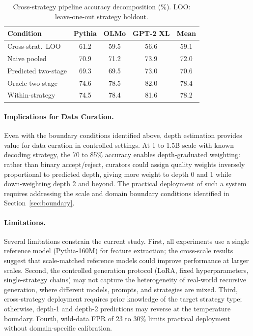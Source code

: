 \documentclass[11pt,a4paper]{article}
\begin{document}
\begin{table}[t]
\centering
\caption{Cross-strategy pipeline accuracy decomposition (\%). LOO: leave-one-out strategy holdout.}
\label{tab:pipeline}
\small
\begin{tabular}{lcccc}
\toprule
Condition & Pythia & OLMo & GPT-2 XL & Mean \\
\midrule
Cross-strat.\ LOO & 61.2 & 59.5 & 56.6 & 59.1 \\
Naive pooled & 70.9 & 71.2 & 73.9 & 72.0 \\
Predicted two-stage & 69.3 & 69.5 & 73.0 & 70.6 \\
Oracle two-stage & 74.6 & 78.5 & 82.0 & 78.4 \\
Within-strategy & 74.5 & 78.4 & 81.6 & 78.2 \\
\bottomrule
\end{tabular}
\end{table}

\paragraph{Implications for Data Curation.}
Even with the boundary conditions identified above, depth estimation provides value for data curation in controlled settings.
At 1 to 1.5B scale with known decoding strategy, the 70 to 85\% accuracy enables depth-graduated weighting: rather than binary accept/reject, curators could assign quality weights inversely proportional to predicted depth, giving more weight to depth 0 and 1 while down-weighting depth 2 and beyond.
The practical deployment of such a system requires addressing the scale and domain boundary conditions identified in Section~\ref{sec:boundary}.

\paragraph{Limitations.}
Several limitations constrain the current study.
First, all experiments use a single reference model (Pythia-160M) for feature extraction; the cross-scale results suggest that scale-matched reference models could improve performance at larger scales.
Second, the controlled generation protocol (LoRA, fixed hyperparameters, single-strategy chains) may not capture the heterogeneity of real-world recursive generation, where different models, prompts, and strategies are mixed.
Third, cross-strategy deployment requires prior knowledge of the target strategy type; otherwise, depth-1 and depth-2 predictions may reverse at the temperature boundary.
Fourth, wild-data FPR of 23 to 30\% limits practical deployment without domain-specific calibration.
\end{document}
